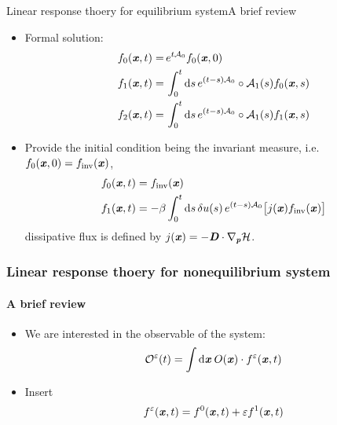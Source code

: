 \documentclass[fleqn]{beamer}
\newcommand{\bluec}[1]{{\color{blue} #1}}
\newcommand{\vect}[1]{\textbf{\textit{#1}}}
\newcommand{\dd}[0]{\textrm{d}}
\newcommand{\fe}{u}
\newcommand{\mh}{\mathcal H}
\newcommand{\eps}{\varepsilon}
\newcommand{\mo}{\mathcal O}
\newcommand{\fwg}{{\mathcal A}}
\newcommand{\inv}{\textrm{inv}}
\begin{document}
\begin{frame}{Linear response thoery for equilibrium system}{A brief review}
  \begin{itemize}
  \item <1-> Formal solution:
    \bluec{
      \begin{align*}
        f_0(\vect x, t)
        =&\,
        e^{t\fwg_0}f_0(\vect x, 0) \\
        f_1(\vect x, t)
        =&\,
        \int_0^t\dd s\,
        e^{(t-s)\fwg_0}\circ
        \fwg_1(s) f_0(\vect x,s)\\
        f_2(\vect x, t)
        =&\,
        \int_0^t\dd s\,
        e^{(t-s)\fwg_0}\circ
        \fwg_1(s) f_1(\vect x,s) 
      \end{align*}
    }
  \item <2-> Provide the initial condition being the invariant measure, i.e.
    \bluec{$f_0(\vect x, 0) = f_{\inv}(\vect x)$},
    \bluec{
      \begin{align*}
        f_0(\vect x, t) &= f_{\inv} (\vect x)\\
        f_1(\vect x, t) &=
        -\beta
        \int_0^t\dd s\,
        \delta\fe(s)\,
        e^{(t-s)\fwg_0}
        \big[
        j(\vect x)
        f_{\inv}(\vect x)
        \big]
      \end{align*}
    }
    {dissipative flux} is defined by \bluec{$j(\vect x)=-\vect D\cdot\nabla_{\vect p}\mh$}.
  \end{itemize}
\end{frame}


\begin{frame}
  \frametitle{Linear response thoery for nonequilibrium system}
  \framesubtitle{A brief review}
  \begin{itemize}
    \vfill
  \item <1-> We are interested in the observable of the system:
    \bluec{
      \begin{align*}
        \mo^\eps(t)= \int\dd \vect x \:O(\vect x)\cdot f^\eps(\vect x, t)
      \end{align*}}
    \vfill
  \item<2-> Insert
    \bluec{
      \begin{align*}
        f^\eps (\vect x, t) = f^0(\vect x, t) + \eps f^1(\vect x, t)        
      \end{align*}
    }
    \vfill
  \end{itemize}
\end{frame}
\end{document}
